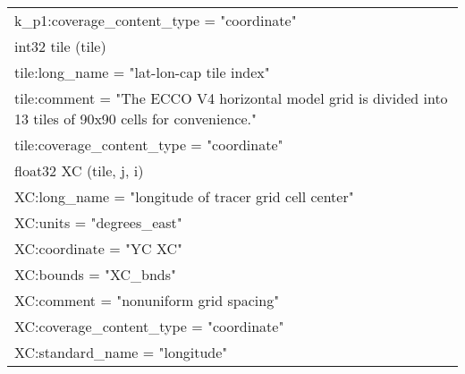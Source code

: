 \begin{longtable}{|p{\textwidth}|}
\rowcolor{Apricot}\hspace{0.5cm}\hspace{0.5cm}k\_p1:coverage\_content\_type = "coordinate"\\
\rowcolor{Apricot}\hspace{0.5cm}int32 tile (tile)\\
\rowcolor{Apricot}\hspace{0.5cm}\hspace{0.5cm}tile:long\_name = "lat-lon-cap tile index"\\
\rowcolor{Apricot}\hspace{0.5cm}\hspace{0.5cm}tile:comment = "The ECCO V4 horizontal model grid is divided into 13 tiles of 90x90 cells for convenience."\\
\rowcolor{Apricot}\hspace{0.5cm}\hspace{0.5cm}tile:coverage\_content\_type = "coordinate"\\
\rowcolor{Apricot}\hspace{0.5cm}float32 XC (tile, j, i)\\
\rowcolor{Apricot}\hspace{0.5cm}\hspace{0.5cm}XC:long\_name = "longitude of tracer grid cell center"\\
\rowcolor{Apricot}\hspace{0.5cm}\hspace{0.5cm}XC:units = "degrees\_east"\\
\rowcolor{Apricot}\hspace{0.5cm}\hspace{0.5cm}XC:coordinate = "YC XC"\\
\rowcolor{Apricot}\hspace{0.5cm}\hspace{0.5cm}XC:bounds = "XC\_bnds"\\
\rowcolor{Apricot}\hspace{0.5cm}\hspace{0.5cm}XC:comment = "nonuniform grid spacing"\\
\rowcolor{Apricot}\hspace{0.5cm}\hspace{0.5cm}XC:coverage\_content\_type = "coordinate"\\
\rowcolor{Apricot}\hspace{0.5cm}\hspace{0.5cm}XC:standard\_name = "longitude"\\

\end{longtable}
